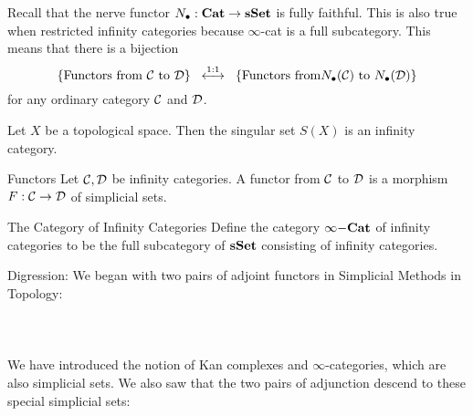 \documentclass[a4paper]{article}
\begin{document}
Recall that the nerve functor $N_\bullet:\bold{Cat}\to\bold{sSet}$ is fully faithful. This is also true when restricted infinity categories because $\infty$-cat is a full subcategory. This means that there is a bijection $$\{\text{Functors from }\mathcal{C}\text{ to }\mathcal{D}\}\;\;\overset{1:1}{\longleftrightarrow}\;\;\{\text{Functors from}N_\bullet(\mathcal{C})\text{ to }N_\bullet(\mathcal{D})\}$$ for any ordinary category $\mathcal{C}$ and $\mathcal{D}$. 

\begin{lmm}{}{} Let $X$ be a topological space. Then the singular set $S(X)$ is an infinity category. 
\end{lmm}

\begin{defn}{Functors}{} Let $\mathcal{C},\mathcal{D}$ be infinity categories. A functor from $\mathcal{C}$ to $\mathcal{D}$ is a morphism $F:\mathcal{C}\to\mathcal{D}$ of simplicial sets. 
\end{defn}

\begin{defn}{The Category of Infinity Categories}{} Define the category $\infty\bold{-Cat}$ of infinity categories to be the full subcategory of $\bold{sSet}$ consisting of infinity categories. 
\end{defn}

Digression: We began with two pairs of adjoint functors in Simplicial Methods in Topology: \\~\\
\\~\\
We have introduced the notion of Kan complexes and $\infty$-categories, which are also simplicial sets. We also saw that the two pairs of adjunction descend to these special simplicial sets: \\~\\
\\~\\
\end{document}

